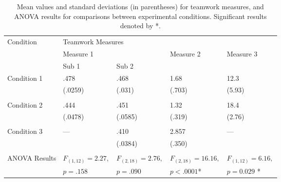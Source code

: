 \begin{center}
\begin{table*}[htbp!]
\small
\begin{center}
\begin{tabular}{l l l l l}
\toprule
Condition & \multicolumn{4}{l}{Teamwork Measures}\\
\cmidrule(r){2-5}
& \multicolumn{2}{l}{Measure 1} & Measure 2 & Measure 3 \\
\cmidrule(r){2-3} 
&  Sub 1 & Sub 2 &  \\ 


\midrule


Condition 1 & .478 & .468 & 1.68 & 12.3  \\
                  & (.0259) & (.031) & (.703) & (5.93) \\
\\

Condition 2 & .444 & .451 & 1.32 & 18.4 \\
                              & (.0478) & (.0585) & (.319) & (2.76) \\
\\

Condition 3 & --- & .410 &  2.857 & --- \\
                     &        & (.0384)  & (.350) & \\
\\


ANOVA Results & $F_{(1,12)} = 2.27,$ & $F_{(2,18)} = 2.76,$  & $F_{(2,18)} = 16.16,$ & $F_{(1,12)} = 6.16,$ \\
                          & $p = .158$ & $p = .090  $ &  $p < .0001$* &  $p = 0.029$ * \\
\bottomrule
\end{tabular}

\caption[a]{Mean values and standard deviations (in parentheses) for teamwork measures, and ANOVA results for comparisons between experimental conditions. Significant results denoted by *.}
\label{tab:bpf_teamwork_results}
\end{center}
\end{table*}
\end{center}

















